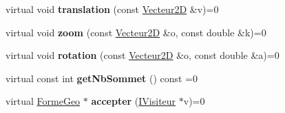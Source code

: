 \begin{DoxyCompactItemize}
virtual void {\bfseries translation} (const \mbox{\hyperlink{class_vecteur2_d}{Vecteur2D}} \&v)=0
\item 
\mbox{\label{class_forme_geo_afaf71a1cf913e8340ea82a73703eb2f1}} 
virtual void {\bfseries zoom} (const \mbox{\hyperlink{class_vecteur2_d}{Vecteur2D}} \&o, const double \&k)=0
\item 
\mbox{\label{class_forme_geo_a05fd8593e4f790c284fdd23bccde5807}} 
virtual void {\bfseries rotation} (const \mbox{\hyperlink{class_vecteur2_d}{Vecteur2D}} \&o, const double \&a)=0
\item 
\mbox{\label{class_forme_geo_a63b4a96f623f0d2b4d1a4541a6e6b3d3}} 
virtual const int {\bfseries get\+Nb\+Sommet} () const =0
\item 
\mbox{\label{class_forme_geo_a9c75bbaa20dffd63aefe1c8de00a9d85}} 
virtual \mbox{\hyperlink{class_forme_geo}{Forme\+Geo}} $\ast$ {\bfseries accepter} (\mbox{\hyperlink{class_i_visiteur}{I\+Visiteur}} $\ast$v)=0
\end{DoxyCompactItemize}
